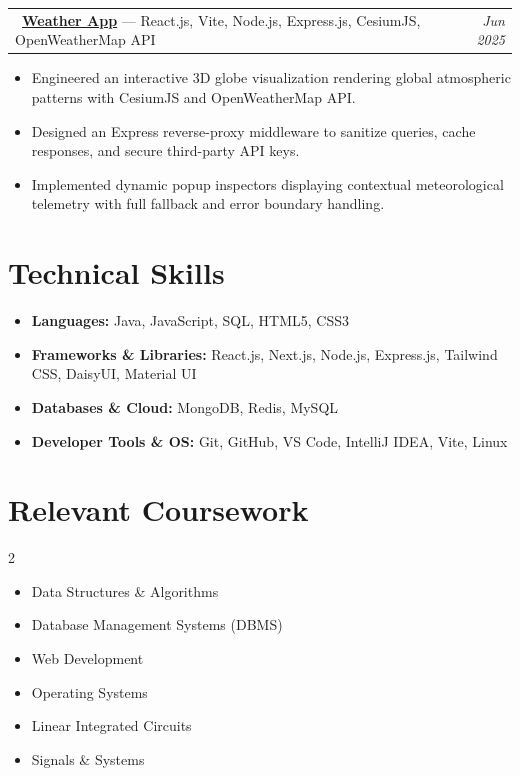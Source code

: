 \documentclass[a4paper,10pt]{article}
\makeatletter
\newcommand{\resumeProjectHeading}[2]{
  \begin{tabular*}{\textwidth}[t]{l@{\extracolsep{\fill}}r}
    #1 & \textit{\small #2} \\
  \end{tabular*}
}
\newcommand{\entryGap}{\vspace{2.5pt}}
\makeatother
\begin{document}
\entryGap
\resumeProjectHeading
  {\href{https://github.com/kgdhake/weather-/tree/master}{\faGithub} \ \textbf{\href{https://weather-three-rose.vercel.app/}{Weather App}} --- React.js, Vite, Node.js, Express.js, CesiumJS, OpenWeatherMap API}{Jun 2025}
\begin{itemize}
    \item Engineered an interactive 3D globe visualization rendering global atmospheric patterns with CesiumJS and OpenWeatherMap API.
    \item Designed an Express reverse-proxy middleware to sanitize queries, cache responses, and secure third-party API keys.
    \item Implemented dynamic popup inspectors displaying contextual meteorological telemetry with full fallback and error boundary handling.
\end{itemize}

\section{Technical Skills}
\begin{itemize}[leftmargin=0pt, label={}, itemsep=1.5pt, topsep=1pt]
    \small
    \item \textbf{Languages:} Java, JavaScript, SQL, HTML5, CSS3
    \item \textbf{Frameworks \& Libraries:} React.js, Next.js, Node.js, Express.js, Tailwind CSS, DaisyUI, Material UI
    \item \textbf{Databases \& Cloud:} MongoDB, Redis, MySQL
    \item \textbf{Developer Tools \& OS:} Git, GitHub, VS Code, IntelliJ IDEA, Vite, Linux
\end{itemize}

\section{Relevant Coursework}
\begin{multicols}{2}
\begin{itemize}
    \item Data Structures \& Algorithms
    \item Database Management Systems (DBMS)
    \item Web Development
    \item Operating Systems
    \item Linear Integrated Circuits
    \item Signals \& Systems
\end{itemize}
\end{multicols}
\end{document}

